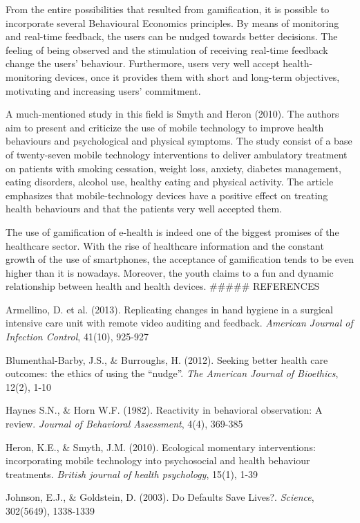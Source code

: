 \documentclass[]{article}
\begin{document}
From the entire possibilities that resulted from gamification, it is
possible to incorporate several Behavioural Economics principles. By
means of monitoring and real-time feedback, the users can be nudged
towards better decisions. The feeling of being observed and the
stimulation of receiving real-time feedback change the users' behaviour.
Furthermore, users very well accept health-monitoring devices, once it
provides them with short and long-term objectives, motivating and
increasing users' commitment.

A much-mentioned study in this field is Smyth and Heron (2010). The
authors aim to present and criticize the use of mobile technology to
improve health behaviours and psychological and physical symptoms. The
study consist of a base of twenty-seven mobile technology interventions
to deliver ambulatory treatment on patients with smoking cessation,
weight loss, anxiety, diabetes management, eating disorders, alcohol
use, healthy eating and physical activity. The article emphasizes that
mobile-technology devices have a positive effect on treating health
behaviours and that the patients very well accepted them.

The use of gamification of e-health is indeed one of the biggest
promises of the healthcare sector. With the rise of healthcare
information and the constant growth of the use of smartphones, the
acceptance of gamification tends to be even higher than it is nowadays.
Moreover, the youth claims to a fun and dynamic relationship between
health and health devices. \#\#\#\#\# REFERENCES

Armellino, D. et al. (2013). Replicating changes in hand hygiene in a
surgical intensive care unit with remote video auditing and feedback.
\emph{American Journal of Infection Control}, 41(10), 925-927

Blumenthal-Barby, J.S., \& Burroughs, H. (2012). Seeking better health
care outcomes: the ethics of using the ``nudge''. \emph{The American
Journal of Bioethics}, 12(2), 1-10

Haynes S.N., \& Horn W.F. (1982). Reactivity in behavioral observation:
A review. \emph{Journal of Behavioral Assessment}, 4(4), 369-385

Heron, K.E., \& Smyth, J.M. (2010). Ecological momentary interventions:
incorporating mobile technology into psychosocial and health behaviour
treatments. \emph{British journal of health psychology}, 15(1), 1-39

Johnson, E.J., \& Goldstein, D. (2003). Do Defaults Save Lives?.
\emph{Science}, 302(5649), 1338-1339
\end{document}
